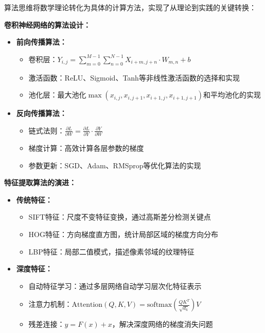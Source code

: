 算法思维将数学理论转化为具体的计算方法，实现了从理论到实践的关键转换：

\textbf{卷积神经网络的算法设计：}
\begin{itemize}
\item \textbf{前向传播算法：}
\begin{itemize}
\item 卷积层：$Y_{i,j} = \sum_{m=0}^{M-1} \sum_{n=0}^{N-1} X_{i+m,j+n} \cdot W_{m,n} + b$
\item 激活函数：ReLU、Sigmoid、Tanh等非线性激活函数的选择和实现
\item 池化层：最大池化$\max(x_{i,j}, x_{i,j+1}, x_{i+1,j}, x_{i+1,j+1})$和平均池化的实现
\end{itemize}
\item \textbf{反向传播算法：}
\begin{itemize}
\item 链式法则：$\frac{\partial L}{\partial W} = \frac{\partial L}{\partial Y} \cdot \frac{\partial Y}{\partial W}$
\item 梯度计算：高效计算各层参数的梯度
\item 参数更新：SGD、Adam、RMSprop等优化算法的实现
\end{itemize}
\end{itemize}

\textbf{特征提取算法的演进：}
\begin{itemize}
\item \textbf{传统特征：}
\begin{itemize}
\item SIFT特征：尺度不变特征变换，通过高斯差分检测关键点
\item HOG特征：方向梯度直方图，统计局部区域的梯度方向分布
\item LBP特征：局部二值模式，描述像素邻域的纹理特征
\end{itemize}
\item \textbf{深度特征：}
\begin{itemize}
\item 自动特征学习：通过多层网络自动学习层次化特征表示
\item 注意力机制：$\text{Attention}(Q,K,V) = \text{softmax}(\frac{QK^T}{\sqrt{d_k}})V$
\item 残差连接：$y = F(x) + x$，解决深度网络的梯度消失问题
\end{itemize}
\end{itemize}

